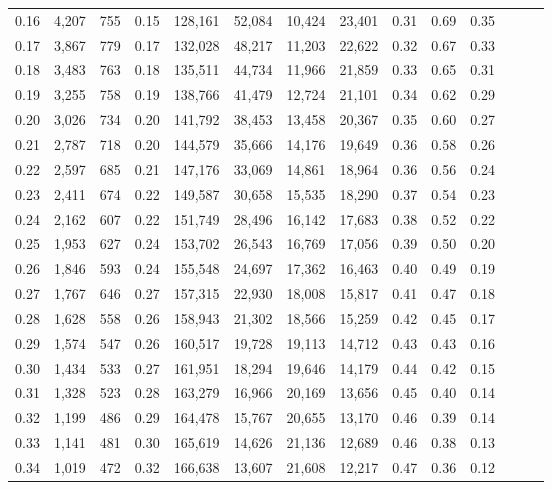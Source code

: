 \begin{tabular}{rrrrrrrrrrrrrr}
0.16 &   4,207 &  755 &  0.15 &  128,161 &   52,084 &  10,424 &  23,401 &  0.31 &  0.69 &      0.35 \\
0.17 &   3,867 &  779 &  0.17 &  132,028 &   48,217 &  11,203 &  22,622 &  0.32 &  0.67 &      0.33 \\
0.18 &   3,483 &  763 &  0.18 &  135,511 &   44,734 &  11,966 &  21,859 &  0.33 &  0.65 &      0.31 \\
0.19 &   3,255 &  758 &  0.19 &  138,766 &   41,479 &  12,724 &  21,101 &  0.34 &  0.62 &      0.29 \\
0.20 &   3,026 &  734 &  0.20 &  141,792 &   38,453 &  13,458 &  20,367 &  0.35 &  0.60 &      0.27 \\
0.21 &   2,787 &  718 &  0.20 &  144,579 &   35,666 &  14,176 &  19,649 &  0.36 &  0.58 &      0.26 \\
0.22 &   2,597 &  685 &  0.21 &  147,176 &   33,069 &  14,861 &  18,964 &  0.36 &  0.56 &      0.24 \\
0.23 &   2,411 &  674 &  0.22 &  149,587 &   30,658 &  15,535 &  18,290 &  0.37 &  0.54 &      0.23 \\
0.24 &   2,162 &  607 &  0.22 &  151,749 &   28,496 &  16,142 &  17,683 &  0.38 &  0.52 &      0.22 \\
0.25 &   1,953 &  627 &  0.24 &  153,702 &   26,543 &  16,769 &  17,056 &  0.39 &  0.50 &      0.20 \\
0.26 &   1,846 &  593 &  0.24 &  155,548 &   24,697 &  17,362 &  16,463 &  0.40 &  0.49 &      0.19 \\
0.27 &   1,767 &  646 &  0.27 &  157,315 &   22,930 &  18,008 &  15,817 &  0.41 &  0.47 &      0.18 \\
0.28 &   1,628 &  558 &  0.26 &  158,943 &   21,302 &  18,566 &  15,259 &  0.42 &  0.45 &      0.17 \\
0.29 &   1,574 &  547 &  0.26 &  160,517 &   19,728 &  19,113 &  14,712 &  0.43 &  0.43 &      0.16 \\
0.30 &   1,434 &  533 &  0.27 &  161,951 &   18,294 &  19,646 &  14,179 &  0.44 &  0.42 &      0.15 \\
0.31 &   1,328 &  523 &  0.28 &  163,279 &   16,966 &  20,169 &  13,656 &  0.45 &  0.40 &      0.14 \\
0.32 &   1,199 &  486 &  0.29 &  164,478 &   15,767 &  20,655 &  13,170 &  0.46 &  0.39 &      0.14 \\
0.33 &   1,141 &  481 &  0.30 &  165,619 &   14,626 &  21,136 &  12,689 &  0.46 &  0.38 &      0.13 \\
0.34 &   1,019 &  472 &  0.32 &  166,638 &   13,607 &  21,608 &  12,217 &  0.47 &  0.36 &      0.12 \\

\end{tabular}
